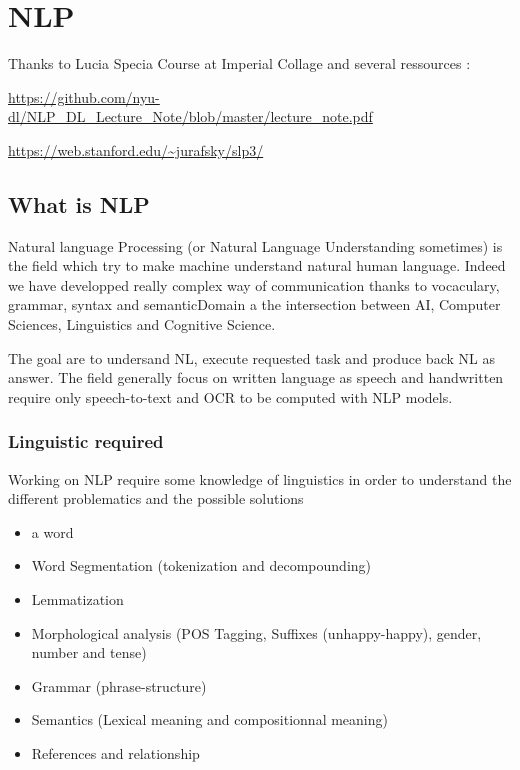 \chapter{NLP} %
\label{cha:nlp}
		
		Thanks to Lucia Specia Course at Imperial Collage and several ressources : \par
		\url{https://github.com/nyu-dl/NLP_DL_Lecture_Note/blob/master/lecture_note.pdf} \par
		\url{https://web.stanford.edu/~jurafsky/slp3/}
		\section{What is NLP}

			Natural language Processing (or Natural Language Understanding sometimes) is the field which try to make machine understand natural human language. Indeed we have developped really complex way of communication thanks to vocaculary, grammar, syntax and semanticDomain a the intersection between AI, Computer Sciences, Linguistics and Cognitive Science.

			The goal are to undersand NL, execute requested task and produce back NL as answer. The field generally focus on written language as speech and handwritten require only speech-to-text and OCR to be computed with NLP models. 

			\subsection{Linguistic required}

				Working on NLP require some knowledge of linguistics in order to understand the different problematics and the possible solutions
				\begin{itemize}
					\item  a word
					\item Word Segmentation (tokenization and decompounding)
					\item Lemmatization
					\item Morphological analysis (POS Tagging, Suffixes (unhappy-happy), gender, number and tense)
					\item Grammar (phrase-structure)
					\item Semantics (Lexical meaning and compositionnal meaning)
					\item References and relationship
				\end{itemize}

